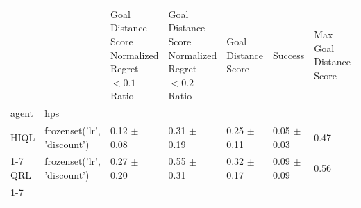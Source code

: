 \begin{tabular}{lllllll}
\toprule
 &  & Goal Distance Score Normalized Regret $< 0.1$ Ratio & Goal Distance Score Normalized Regret $< 0.2$ Ratio & Goal Distance Score & Success & Max Goal Distance Score \\
agent & hps &  &  &  &  &  \\
\midrule
HIQL & frozenset({'lr', 'discount'}) & 0.12 $\pm$ 0.08 & 0.31 $\pm$ 0.19 & 0.25 $\pm$ 0.11 & 0.05 $\pm$ 0.03 & 0.47 \\
\cline{1-7}
QRL & frozenset({'lr', 'discount'}) & 0.27 $\pm$ 0.20 & 0.55 $\pm$ 0.31 & 0.32 $\pm$ 0.17 & 0.09 $\pm$ 0.09 & 0.56 \\
\cline{1-7}
\bottomrule
\end{tabular}
